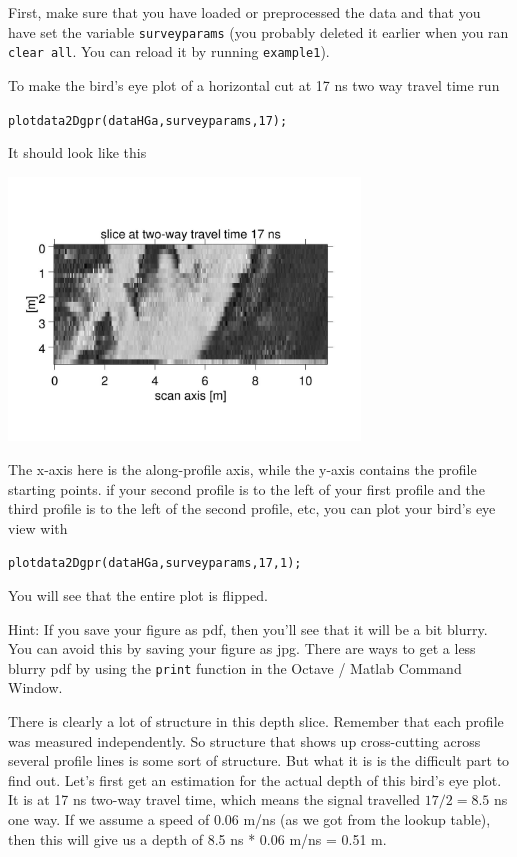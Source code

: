 \documentclass[11pt]{article}
\begin{document}
First, make sure that you have loaded or preprocessed the data and
that you have set the variable \verb#surveyparams# (you probably
deleted it earlier when you ran \verb#clear all#. You can reload it by
running \verb#example1#).

To make the bird's eye plot of a horizontal cut at 17 ns two way
travel time run

\qquad \verb#plotdata2Dgpr(dataHGa,surveyparams,17);#

It should look like this
\begin{center}
\includegraphics[width=0.7\textwidth, trim = 1cm 3cm 1cm
  3cm,clip]{figures/Area17ns.jpg}
\end{center}

The x-axis here is the along-profile axis, while the y-axis contains
the profile starting points. if your second profile is to the left of
your first profile and the third profile is to the left of the second
profile, etc, you can plot your bird's eye view with

\qquad \verb#plotdata2Dgpr(dataHGa,surveyparams,17,1);#

You will see that the entire plot is flipped.

Hint: If you save your figure as pdf, then you'll see that it will be
a bit blurry. You can avoid this by saving your figure as jpg. There
are ways to get a less blurry pdf by using the \verb#print# function
in the Octave / Matlab Command Window.

There is clearly a lot of structure in this depth slice. Remember that
each profile was measured independently. So structure that shows up
cross-cutting across several profile lines is some sort of
structure. But what it is is the difficult part to find out. Let's
first get an estimation for the actual depth of this bird's eye
plot. It is at 17 ns two-way travel time, which means the signal
travelled $17/2=8.5$ ns one way. If we assume a speed of 0.06 m/ns (as
we got from the lookup table), then this will give us a depth of 8.5
ns * 0.06 m/ns = 0.51 m.
\end{document}
